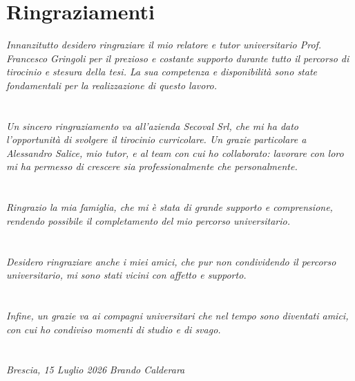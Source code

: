 \documentclass[12pt, a4paper, oneside]{report}
\begin{document}
\chapter*{Ringraziamenti}
\textit{Innanzitutto desidero ringraziare il mio relatore e tutor universitario Prof. \\Francesco Gringoli per il prezioso e costante supporto durante tutto il percorso di tirocinio e stesura della tesi. La sua competenza e disponibilità sono state fondamentali per la realizzazione di questo lavoro.}
\\
\\
\\
\textit{Un sincero ringraziamento va all'azienda Secoval Srl, che mi ha dato l'opportunità di svolgere il tirocinio curricolare. Un grazie particolare a Alessandro Salice, mio tutor, e al team con cui ho collaborato: lavorare con loro mi ha permesso di crescere sia professionalmente che personalmente.}
\\
\\
\\
\textit{Ringrazio la mia famiglia, che mi è stata di grande supporto e comprensione, rendendo possibile il completamento del mio percorso universitario.}
\\
\\
\\
\textit{Desidero ringraziare anche i miei amici, che pur non condividendo il percorso universitario, mi sono stati vicini con affetto e supporto.}%
\\
\\
\\
\textit{Infine, un grazie va ai compagni universitari che nel tempo sono
    diventati amici, con cui ho condiviso momenti di studio e di svago.}
\\
\\
\\
\textit{Brescia, 15 Luglio 2026}
\hfill{}
\textit{Brando Calderara}
\clearpage
\thispagestyle{empty} %
\mbox{}               %
\clearpage
\end{document}
